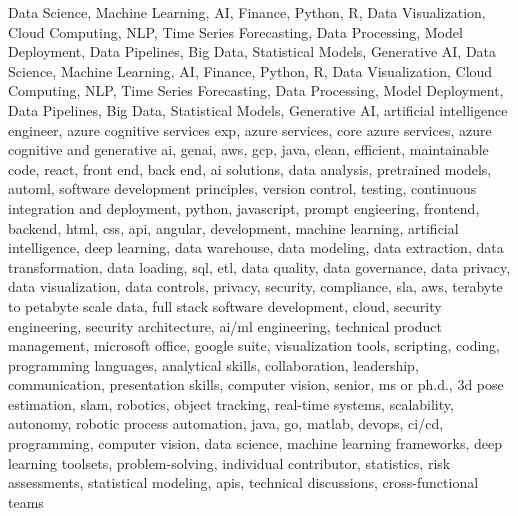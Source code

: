 \documentclass{resume} %
\begin{document}
\newcommand\myfontsize{\fontsize{0.1pt}{0.1pt}\selectfont} \myfontsize \color{white}
Data Science, Machine Learning, AI, Finance, Python, R, Data Visualization, Cloud Computing, NLP, Time Series Forecasting, Data Processing, Model Deployment, Data Pipelines, Big Data, Statistical Models, Generative AI, Data Science, Machine Learning, AI, Finance, Python, R, Data Visualization, Cloud Computing, NLP, Time Series Forecasting, Data Processing, Model Deployment, Data Pipelines, Big Data, Statistical Models, Generative AI, {artificial intelligence engineer, azure cognitive services exp, azure services, core azure services, azure cognitive and generative ai, genai, aws,  gcp, java, clean, efficient, maintainable code, react, front end, back end, ai solutions, data analysis, pretrained models, automl, software development principles, version control, testing, continuous integration and deployment, python, javascript, prompt engieering, frontend, backend, html, css, api, angular, development, machine learning, artificial intelligence, deep learning, data warehouse, data modeling, data extraction, data transformation, data loading, sql, etl, data quality, data governance, data privacy, data visualization, data controls, privacy, security, compliance, sla, aws, terabyte to petabyte scale data, full stack software development, cloud, security engineering, security architecture, ai/ml engineering, technical product management, microsoft office, google suite, visualization tools, scripting, coding, programming languages, analytical skills, collaboration, leadership, communication, presentation skills, computer vision, senior, ms or ph.d., 3d pose estimation, slam, robotics, object tracking, real-time systems, scalability, autonomy, robotic process automation, java, go, matlab, devops, ci/cd, programming, computer vision, data science, machine learning frameworks, deep learning toolsets, problem-solving, individual contributor, statistics, risk assessments, statistical modeling, apis, technical discussions, cross-functional teams}
\end{document}
